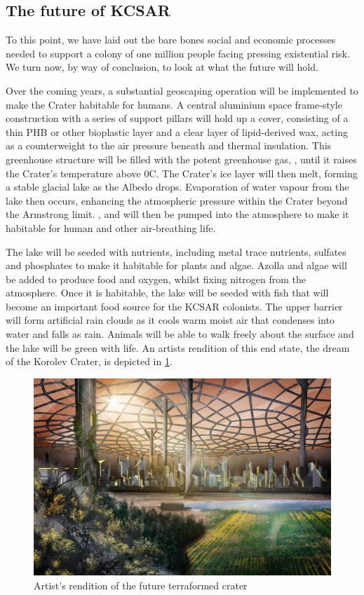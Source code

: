 \documentclass[fleqn,10pt]{Stylesheet} %
\begin{document}
\subsection{The future of KCSAR}
To this point, we have laid out the bare bones social and economic processes needed to support a colony of one million people facing pressing existential risk. We turn now, by way of conclusion, to look at what the future will hold. 

Over the coming years, a substantial geoscaping operation will be implemented to make the Crater habitable for humans. A central aluminium space frame-style construction with a series of support pillars will hold up a cover, consisting of a thin PHB or other bioplastic layer and a clear layer of lipid-derived wax, acting as a counterweight to the air pressure beneath and thermal insulation. This greenhouse structure will be filled with the potent greenhouse gas, , until it raises the Crater's temperature above 0\degree{}C. The Crater’s ice layer will then melt, forming a stable glacial lake as the Albedo drops. Evaporation of water vapour from the lake then occurs, enhancing the atmospheric pressure within the Crater beyond the Armstrong limit.  ,  and  will then be pumped into the atmosphere to make it habitable for human and other air-breathing life.

The lake will be seeded with nutrients, including metal trace nutrients, sulfates and phosphates to make it habitable for plants and algae. Azolla and algae will be added to produce food and oxygen, whilst fixing nitrogen from the atmosphere. Once it is habitable, the lake will be seeded with fish that will become an important food source for the KCSAR colonists. The upper barrier will form artificial rain clouds as it cools warm moist air that condenses into water and falls as rain. Animals will be able to walk freely about the surface and the lake will be green with life. An artists rendition of this end state, the dream of the Korolev Crater, is depicted in \ref{fig:final_dome}.

\begin{figure}
    \centering
    \includegraphics[width=\linewidth]{art/terraformed_dome.jpg}
    \caption{Artist's rendition of the future terraformed crater}
    \label{fig:final_dome}
\end{figure}
\end{document}
